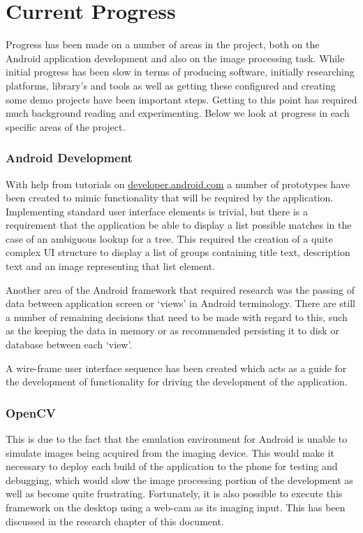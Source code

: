 \chapter{Current Progress}

Progress has been made on a number of areas in the project, both on the Android application development and also on the image processing task. While initial progress has been slow in terms of producing software, initially researching platforms, library's and tools as well as getting these configured and creating some demo projects have been important steps. Getting to this point has required much background reading and experimenting. Below we look at progress in each specific areas of the project.

\subsection*{Android Development}
With help from tutorials on \url{developer.android.com} a number of prototypes have been created to mimic functionality that will be required by the application. Implementing standard user interface elements is trivial, but there is a requirement that the application be able to display a list possible matches in the case of an ambiguous lookup for a tree. This required the creation of a  quite complex UI structure to display a list of groups containing title text, description text and an image representing that list element.

Another area of the Android framework that required research was the passing of data between application screen or ‘views’ in Android terminology. There are still a number of remaining decisions that need to be made with regard to this, such as the keeping the data in memory or as recommended persisting it to disk or database between each ‘view’.

A wire-frame user interface sequence has been created which acts as a guide for the development of functionality for driving the development of the application.

\subsection*{OpenCV}

This is due to the fact that the emulation environment for Android is unable to simulate images being acquired from the imaging device. This would make it necessary to deploy each build of the application to the phone for testing and debugging, which would slow the image processing portion of the development as well as become quite frustrating. Fortunately, it is also possible to execute this framework on the desktop using a web-cam as its imaging input. This has been discussed in the research chapter of this document.

